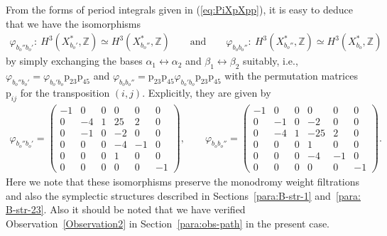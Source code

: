 \documentclass[pdftex]{sigma}
\numberwithin{equation}{section}
\begin{document}
From the forms of period integrals given in (\ref{eq:PiXpXpp}), it is easy to deduce that we have the isomorphisms
\begin{gather*}
\varphi_{b_{o}''b_{o}'}\colon \ H^{3}(X_{b_{o}'}^{*},\mathbb{Z})\simeq H^{3}(X_{b_{o}''}^{*},\mathbb{Z})\qquad \text{and} \qquad \varphi_{b_{o}b_{o}''}\colon \ H^{3}(X_{b_{o}''}^{*},\mathbb{Z})\simeq H^{3}(X_{b_{o}}^{*},\mathbb{Z})
\end{gather*}
by simply exchanging the bases $\alpha_{1}\leftrightarrow\alpha_{2}$ and $\beta_{1}\leftrightarrow\beta_{2}$ suitably, i.e., $\varphi_{b_{o}''b_{o}'}=\varphi_{b_{o}'b_{o}}\mathrm{p}_{23}\mathrm{p}_{45}$ and $\varphi_{b_{o}b_{o}''}=\mathrm{p}_{23}\mathrm{p}_{45}\varphi_{b_{o}'b_{o}}\mathrm{p}_{23}\mathrm{p}_{45}$ with the permutation matrices $\mathrm{p}_{ij}$ for the transposition $(i,j)$. Explicitly, they are given by
\begin{gather*}
\varphi_{b_{o}''b_{o}'}=\left(\begin{smallmatrix}-1 & 0 & 0 & 0 & 0 & 0\\
0 & -4 & 1 & 25 & 2 & 0\\
0 & -1 & 0 & -2 & 0 & 0\\
0 & 0 & 0 & -4 & -1 & 0\\
0 & 0 & 0 & 1 & 0 & 0\\
0 & 0 & 0 & 0 & 0 & -1
\end{smallmatrix}\right),\qquad \varphi_{b_{o}b_{o}''}=\left(\begin{smallmatrix}-1 & 0 & 0 & 0 & 0 & 0\\
0 & -1 & 0 & -2 & 0 & 0\\
0 & -4 & 1 & -25 & 2 & 0\\
0 & 0 & 0 & 1 & 0 & 0\\
0 & 0 & 0 & -4 & -1 & 0\\
0 & 0 & 0 & 0 & 0 & -1
\end{smallmatrix}\right).
\end{gather*}
Here we note that these isomorphisms preserve the monodromy weight filtrations and also the symplectic structures described in Sections~\ref{para:B-str-1} and~\ref{para: B-str-23}. Also it should be noted that we have verified Observation~\ref{Observation2} in Section~\ref{para:obs-path} in the present case.
\end{document}
